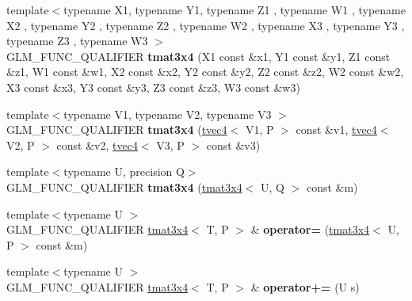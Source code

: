 \begin{DoxyCompactItemize}
\item 
{\footnotesize template$<$typename X1, typename Y1, typename Z1 , typename W1 , typename X2 , typename Y2 , typename Z2 , typename W2 , typename X3 , typename Y3 , typename Z3 , typename W3 $>$ }\\G\+L\+M\+\_\+\+F\+U\+N\+C\+\_\+\+Q\+U\+A\+L\+I\+F\+I\+ER {\bfseries tmat3x4} (X1 const \&x1, Y1 const \&y1, Z1 const \&z1, W1 const \&w1, X2 const \&x2, Y2 const \&y2, Z2 const \&z2, W2 const \&w2, X3 const \&x3, Y3 const \&y3, Z3 const \&z3, W3 const \&w3)\hypertarget{structglm_1_1detail_1_1tmat3x4_a16b2c248a1909f7f319b8e050f93e3b4}{}\label{structglm_1_1detail_1_1tmat3x4_a16b2c248a1909f7f319b8e050f93e3b4}

\item 
{\footnotesize template$<$typename V1, typename V2, typename V3 $>$ }\\G\+L\+M\+\_\+\+F\+U\+N\+C\+\_\+\+Q\+U\+A\+L\+I\+F\+I\+ER {\bfseries tmat3x4} (\hyperlink{structglm_1_1detail_1_1tvec4}{tvec4}$<$ V1, P $>$ const \&v1, \hyperlink{structglm_1_1detail_1_1tvec4}{tvec4}$<$ V2, P $>$ const \&v2, \hyperlink{structglm_1_1detail_1_1tvec4}{tvec4}$<$ V3, P $>$ const \&v3)\hypertarget{structglm_1_1detail_1_1tmat3x4_acace185cb00ee79dd090605deefb3dfa}{}\label{structglm_1_1detail_1_1tmat3x4_acace185cb00ee79dd090605deefb3dfa}

\item 
{\footnotesize template$<$typename U, precision Q$>$ }\\G\+L\+M\+\_\+\+F\+U\+N\+C\+\_\+\+Q\+U\+A\+L\+I\+F\+I\+ER {\bfseries tmat3x4} (\hyperlink{structglm_1_1detail_1_1tmat3x4}{tmat3x4}$<$ U, Q $>$ const \&m)\hypertarget{structglm_1_1detail_1_1tmat3x4_a3ccf735b71ee0db9bbeb1dd33022a761}{}\label{structglm_1_1detail_1_1tmat3x4_a3ccf735b71ee0db9bbeb1dd33022a761}

\item 
{\footnotesize template$<$typename U $>$ }\\G\+L\+M\+\_\+\+F\+U\+N\+C\+\_\+\+Q\+U\+A\+L\+I\+F\+I\+ER \hyperlink{structglm_1_1detail_1_1tmat3x4}{tmat3x4}$<$ T, P $>$ \& {\bfseries operator=} (\hyperlink{structglm_1_1detail_1_1tmat3x4}{tmat3x4}$<$ U, P $>$ const \&m)\hypertarget{structglm_1_1detail_1_1tmat3x4_aca5ba516f89ecc2713770dccad41578b}{}\label{structglm_1_1detail_1_1tmat3x4_aca5ba516f89ecc2713770dccad41578b}

\item 
{\footnotesize template$<$typename U $>$ }\\G\+L\+M\+\_\+\+F\+U\+N\+C\+\_\+\+Q\+U\+A\+L\+I\+F\+I\+ER \hyperlink{structglm_1_1detail_1_1tmat3x4}{tmat3x4}$<$ T, P $>$ \& {\bfseries operator+=} (U s)\hypertarget{structglm_1_1detail_1_1tmat3x4_a3019cac6fe66503e9e8d45f7c1485b20}{}\label{structglm_1_1detail_1_1tmat3x4_a3019cac6fe66503e9e8d45f7c1485b20}


\end{DoxyCompactItemize}
